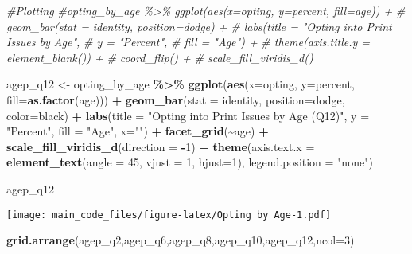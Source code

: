 \documentclass[
]{article}
\newenvironment{Shaded}{\begin{snugshade}}{\end{snugshade}}
\newcommand{\AttributeTok}[1]{\textcolor[rgb]{0.13,0.29,0.53}{#1}}
\newcommand{\CommentTok}[1]{\textcolor[rgb]{0.56,0.35,0.01}{\textit{#1}}}
\newcommand{\DecValTok}[1]{\textcolor[rgb]{0.00,0.00,0.81}{#1}}
\newcommand{\FunctionTok}[1]{\textcolor[rgb]{0.13,0.29,0.53}{\textbf{#1}}}
\newcommand{\NormalTok}[1]{#1}
\newcommand{\OtherTok}[1]{\textcolor[rgb]{0.56,0.35,0.01}{#1}}
\newcommand{\SpecialCharTok}[1]{\textcolor[rgb]{0.81,0.36,0.00}{\textbf{#1}}}
\newcommand{\StringTok}[1]{\textcolor[rgb]{0.31,0.60,0.02}{#1}}
\begin{document}
\begin{Shaded}
\begin{Highlighting}[]
\CommentTok{\#Plotting }
\CommentTok{\#opting\_by\_age \%\textgreater{}\% ggplot(aes(x=opting, y=percent, fill=age)) +}
\CommentTok{\#  geom\_bar(stat = \textquotesingle{}identity\textquotesingle{}, position=\textquotesingle{}dodge\textquotesingle{}) +}
\CommentTok{\#  labs(title = "Opting into Print Issues by Age",}
\CommentTok{\#       y = "Percent",}
\CommentTok{\#       fill = "Age") +}
\CommentTok{\#  theme(axis.title.y = element\_blank()) +}
\CommentTok{\#  coord\_flip() +}
\CommentTok{\#  scale\_fill\_viridis\_d()}

\NormalTok{agep\_q12 }\OtherTok{\textless{}{-}}\NormalTok{ opting\_by\_age }\SpecialCharTok{\%\textgreater{}\%} \FunctionTok{ggplot}\NormalTok{(}\FunctionTok{aes}\NormalTok{(}\AttributeTok{x=}\NormalTok{opting, }\AttributeTok{y=}\NormalTok{percent, }\AttributeTok{fill=}\FunctionTok{as.factor}\NormalTok{(age))) }\SpecialCharTok{+}
  \FunctionTok{geom\_bar}\NormalTok{(}\AttributeTok{stat =} \StringTok{\textquotesingle{}identity\textquotesingle{}}\NormalTok{, }\AttributeTok{position=}\StringTok{\textquotesingle{}dodge\textquotesingle{}}\NormalTok{, }\AttributeTok{color=}\StringTok{\textquotesingle{}black\textquotesingle{}}\NormalTok{) }\SpecialCharTok{+}
  \FunctionTok{labs}\NormalTok{(}\AttributeTok{title =} \StringTok{"Opting into Print Issues by Age (Q12)"}\NormalTok{,}
       \AttributeTok{y =} \StringTok{"Percent"}\NormalTok{,}
       \AttributeTok{fill =} \StringTok{"Age"}\NormalTok{,}
       \AttributeTok{x=}\StringTok{""}\NormalTok{) }\SpecialCharTok{+}
  \FunctionTok{facet\_grid}\NormalTok{(}\SpecialCharTok{\textasciitilde{}}\NormalTok{age) }\SpecialCharTok{+}
  \FunctionTok{scale\_fill\_viridis\_d}\NormalTok{(}\AttributeTok{direction =} \SpecialCharTok{{-}}\DecValTok{1}\NormalTok{) }\SpecialCharTok{+}
  \FunctionTok{theme}\NormalTok{(}\AttributeTok{axis.text.x =} \FunctionTok{element\_text}\NormalTok{(}\AttributeTok{angle =} \DecValTok{45}\NormalTok{, }\AttributeTok{vjust =} \DecValTok{1}\NormalTok{, }\AttributeTok{hjust=}\DecValTok{1}\NormalTok{),}
        \AttributeTok{legend.position =} \StringTok{"none"}\NormalTok{) }

\NormalTok{agep\_q12}
\end{Highlighting}
\end{Shaded}

\texttt{[image: main\_code\_files/figure-latex/Opting by Age-1.pdf]}

\begin{Shaded}
\begin{Highlighting}[]
\FunctionTok{grid.arrange}\NormalTok{(agep\_q2,agep\_q6,agep\_q8,agep\_q10,agep\_q12,}\AttributeTok{ncol=}\DecValTok{3}\NormalTok{)}
\end{Highlighting}
\end{Shaded}
\end{document}

